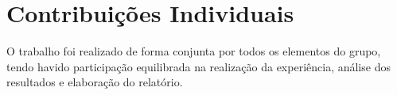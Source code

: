 \section{Contribuições Individuais}
O trabalho foi realizado de forma conjunta por todos os elementos do grupo, tendo havido
participação equilibrada na realização da experiência, análise dos resultados e elaboração do
relatório.